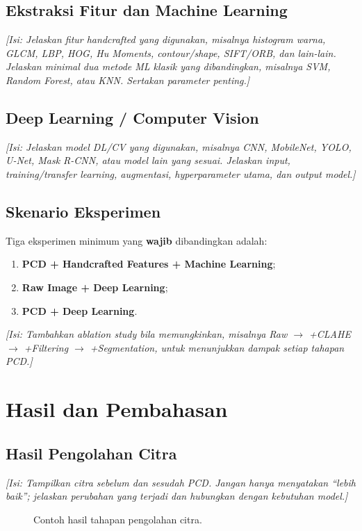 \documentclass[10pt,twocolumn,a4paper]{article}
\newcommand{\isian}[1]{\textcolor{notegray}{\textit{[Isi: #1]}}}
\begin{document}
\subsection{Ekstraksi Fitur dan Machine Learning}
\isian{Jelaskan fitur handcrafted yang digunakan, misalnya histogram warna, GLCM, LBP, HOG, Hu Moments, contour/shape, SIFT/ORB, dan lain-lain. Jelaskan minimal dua metode ML klasik yang dibandingkan, misalnya SVM, Random Forest, atau KNN. Sertakan parameter penting.}

\subsection{Deep Learning / Computer Vision}
\isian{Jelaskan model DL/CV yang digunakan, misalnya CNN, MobileNet, YOLO, U-Net, Mask R-CNN, atau model lain yang sesuai. Jelaskan input, training/transfer learning, augmentasi, hyperparameter utama, dan output model.}

\subsection{Skenario Eksperimen}
Tiga eksperimen minimum yang \textbf{wajib} dibandingkan adalah:
\begin{enumerate}[leftmargin=*]
    \item \textbf{PCD + Handcrafted Features + Machine Learning};
    \item \textbf{Raw Image + Deep Learning};
    \item \textbf{PCD + Deep Learning}.
\end{enumerate}
\isian{Tambahkan ablation study bila memungkinkan, misalnya Raw $\rightarrow$ +CLAHE $\rightarrow$ +Filtering $\rightarrow$ +Segmentation, untuk menunjukkan dampak setiap tahapan PCD.}

\section{Hasil dan Pembahasan}
\subsection{Hasil Pengolahan Citra}
\isian{Tampilkan citra sebelum dan sesudah PCD. Jangan hanya menyatakan ``lebih baik''; jelaskan perubahan yang terjadi dan hubungkan dengan kebutuhan model.}

\begin{figure}[H]
\centering
{}
\caption{Contoh hasil tahapan pengolahan citra.}
\label{fig:pcdresult}
\end{figure}
\end{document}
